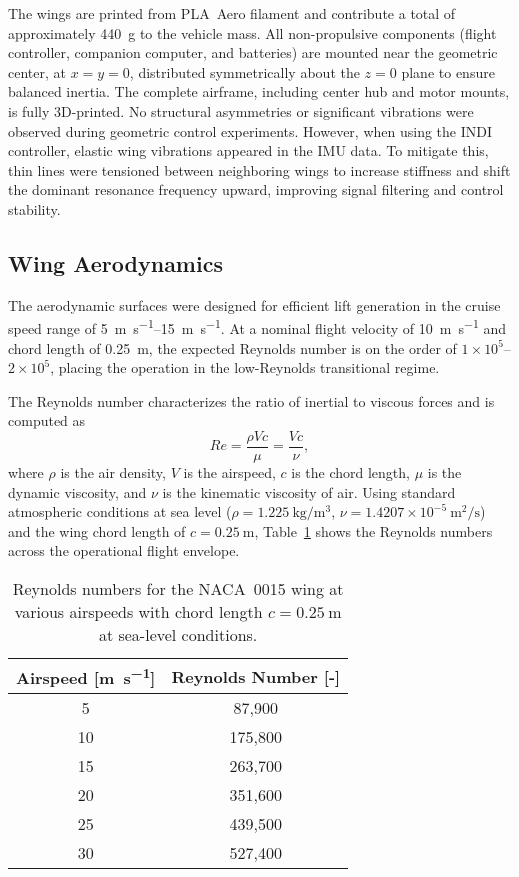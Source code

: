 The wings are printed from PLA~Aero filament and contribute a total of approximately \SI{440}{\gram} to the vehicle mass.  
All non-propulsive components (flight controller, companion computer, and batteries) are mounted near the geometric center, at \(x=y=0\), distributed symmetrically about the \(z=0\) plane to ensure balanced inertia.  
The complete airframe, including center hub and motor mounts, is fully 3D-printed.  
No structural asymmetries or significant vibrations were observed during geometric control experiments.  
However, when using the INDI controller, elastic wing vibrations appeared in the IMU data.  
To mitigate this, thin lines were tensioned between neighboring wings to increase stiffness and shift the dominant resonance frequency upward, improving signal filtering and control stability.

\subsection{Wing Aerodynamics}

The aerodynamic surfaces were designed for efficient lift generation in the cruise speed range of \SIrange{5}{15}{\meter\per\second}.  
At a nominal flight velocity of \SI{10}{\meter\per\second} and chord length of \SI{0.25}{\meter}, the expected Reynolds number is on the order of \(1\times10^5\)–\(2\times10^5\), placing the operation in the low-Reynolds transitional regime.

The Reynolds number characterizes the ratio of inertial to viscous forces and is computed as
\begin{equation}
Re = \frac{\rho V c}{\mu} = \frac{V c}{\nu},
\label{eq:reynolds_number}
\end{equation}
where \(\rho\) is the air density, \(V\) is the airspeed, \(c\) is the chord length, \(\mu\) is the dynamic viscosity, and \(\nu\) is the kinematic viscosity of air.
Using standard atmospheric conditions at sea level (\(\rho = 1.225~\mathrm{kg/m^3}\), \(\nu = 1.4207 \times 10^{-5}~\mathrm{m^2/s}\)) and the wing chord length of \(c = 0.25~\mathrm{m}\), Table~\ref{tab:reynolds_numbers} shows the Reynolds numbers across the operational flight envelope.

\begin{table}[htbp]
\centering
\caption{Reynolds numbers for the NACA~0015 wing at various airspeeds with chord length \(c = 0.25~\mathrm{m}\) at sea-level conditions.}
\label{tab:reynolds_numbers}
\begin{tabular}{cc}
\hline
Airspeed [\si{\meter\per\second}] & Reynolds Number [-] \\
\hline
5  & 87,900 \\
10 & 175,800 \\
15 & 263,700 \\
20 & 351,600 \\
25 & 439,500 \\
30 & 527,400 \\
\hline
\end{tabular}
\end{table}

